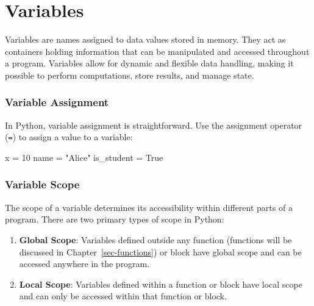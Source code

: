 \documentclass[
  letterpaper,
  DIV=11,
  numbers=noendperiod]{scrreprt}
\newenvironment{Shaded}{\begin{snugshade}}{\end{snugshade}}
\newcommand{\DecValTok}[1]{\textcolor[rgb]{0.68,0.00,0.00}{#1}}
\newcommand{\NormalTok}[1]{\textcolor[rgb]{0.00,0.23,0.31}{#1}}
\newcommand{\OperatorTok}[1]{\textcolor[rgb]{0.37,0.37,0.37}{#1}}
\newcommand{\StringTok}[1]{\textcolor[rgb]{0.13,0.47,0.30}{#1}}
\newcommand{\VariableTok}[1]{\textcolor[rgb]{0.07,0.07,0.07}{#1}}
\providecommand{\tightlist}{%
  \setlength{\itemsep}{0pt}\setlength{\parskip}{0pt}}\usepackage{longtable,booktabs,array}
\begin{document}
\hypertarget{variables}{%
\section{Variables}\label{variables}}

Variables are names assigned to data values stored in memory. They act
as containers holding information that can be manipulated and accessed
throughout a program. Variables allow for dynamic and flexible data
handling, making it possible to perform computations, store results, and
manage state.

\hypertarget{variable-assignment}{%
\subsubsection{Variable Assignment}\label{variable-assignment}}

In Python, variable assignment is straightforward. Use the assignment
operator (\texttt{=}) to assign a value to a variable:

\begin{Shaded}
\begin{Highlighting}[]
\NormalTok{x }\OperatorTok{=} \DecValTok{10}
\NormalTok{name }\OperatorTok{=} \StringTok{"Alice"}
\NormalTok{is\_student }\OperatorTok{=} \VariableTok{True}
\end{Highlighting}
\end{Shaded}

\hypertarget{variable-scope}{%
\subsubsection{Variable Scope}\label{variable-scope}}

The scope of a variable determines its accessibility within different
parts of a program. There are two primary types of scope in Python:

\begin{enumerate}
\def\labelenumi{\arabic{enumi}.}
\tightlist
\item
  \textbf{Global Scope}: Variables defined outside any function
  (functions will be discussed in Chapter~\ref{sec-functions}) or block
  have global scope and can be accessed anywhere in the program.
\item
  \textbf{Local Scope}: Variables defined within a function or block
  have local scope and can only be accessed within that function or
  block.
\end{enumerate}
\end{document}
